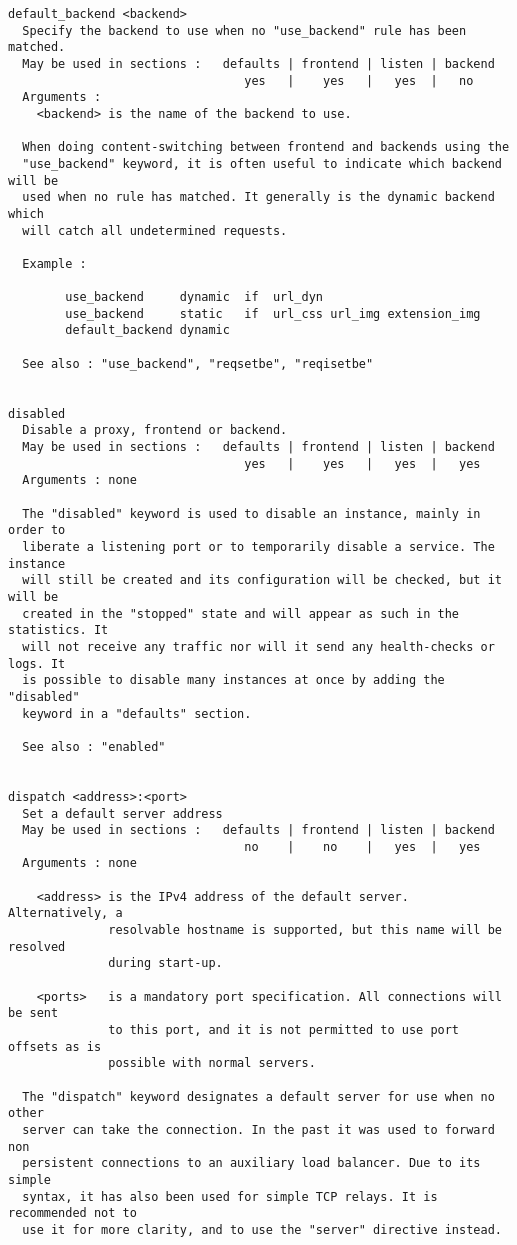 \begin{verbatim}
default_backend <backend>
  Specify the backend to use when no "use_backend" rule has been matched.
  May be used in sections :   defaults | frontend | listen | backend
                                 yes   |    yes   |   yes  |   no
  Arguments :
    <backend> is the name of the backend to use.

  When doing content-switching between frontend and backends using the
  "use_backend" keyword, it is often useful to indicate which backend will be
  used when no rule has matched. It generally is the dynamic backend which
  will catch all undetermined requests.

  Example :

        use_backend     dynamic  if  url_dyn
        use_backend     static   if  url_css url_img extension_img
        default_backend dynamic

  See also : "use_backend", "reqsetbe", "reqisetbe"


disabled
  Disable a proxy, frontend or backend.
  May be used in sections :   defaults | frontend | listen | backend
                                 yes   |    yes   |   yes  |   yes
  Arguments : none

  The "disabled" keyword is used to disable an instance, mainly in order to
  liberate a listening port or to temporarily disable a service. The instance
  will still be created and its configuration will be checked, but it will be
  created in the "stopped" state and will appear as such in the statistics. It
  will not receive any traffic nor will it send any health-checks or logs. It
  is possible to disable many instances at once by adding the "disabled"
  keyword in a "defaults" section.

  See also : "enabled"


dispatch <address>:<port>
  Set a default server address
  May be used in sections :   defaults | frontend | listen | backend
                                 no    |    no    |   yes  |   yes
  Arguments : none

    <address> is the IPv4 address of the default server. Alternatively, a
              resolvable hostname is supported, but this name will be resolved
              during start-up.

    <ports>   is a mandatory port specification. All connections will be sent
              to this port, and it is not permitted to use port offsets as is
              possible with normal servers.

  The "dispatch" keyword designates a default server for use when no other
  server can take the connection. In the past it was used to forward non
  persistent connections to an auxiliary load balancer. Due to its simple
  syntax, it has also been used for simple TCP relays. It is recommended not to
  use it for more clarity, and to use the "server" directive instead.


\end{verbatim}
